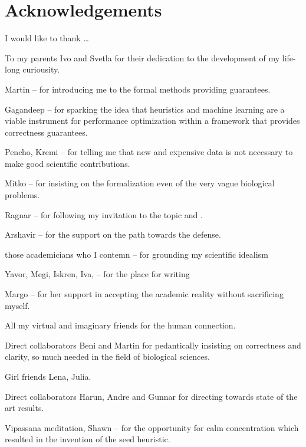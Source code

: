 
\bigskip

\begingroup
\let\clearpage\relax
\let\cleardoublepage\relax
\let\cleardoublepage\relax
\chapter*{Acknowledgements}

\def\thanks#1{%
\begingroup
\leftskip1em
\noindent #1
\par
\endgroup
}

I would like to thank \dots

To my parents Ivo and Svetla for their dedication to the development of my
life-long curiousity.

Martin -- for introducing me to the formal methods providing guarantees.

Gagandeep -- for sparking the idea that heuristics and machine learning are a
viable instrument for performance optimization within a framework that provides
correctness guarantees.

Pencho, Kremi -- for telling me that new and expensive data is not necessary to make
good scientific contributions.

Mitko -- for insisting on the formalization even of the very vague biological
problems.

Ragnar -- for following my invitation to the topic and .

Arshavir -- for the support on the path towards the defense.

those academicians who I contemn -- for grounding my scientific idealism 

Yavor, Megi, Iskren, Iva, -- for the place for writing

Margo -- for her support in accepting the academic reality without sacrificing myself.

All my virtual and imaginary friends for the human connection.

Direct collaborators Beni and Martin for pedantically insisting on correctness
and clarity, so much needed in the field of biological sciences.

Girl friends Lena, Julia.

Direct collaborators Harun, Andre and Gunnar for directing towards state of the art results.

Vipassana meditation, Shawn -- for the opportunity for calm concentration which
resulted in the invention of the seed heuristic.

\endgroup
